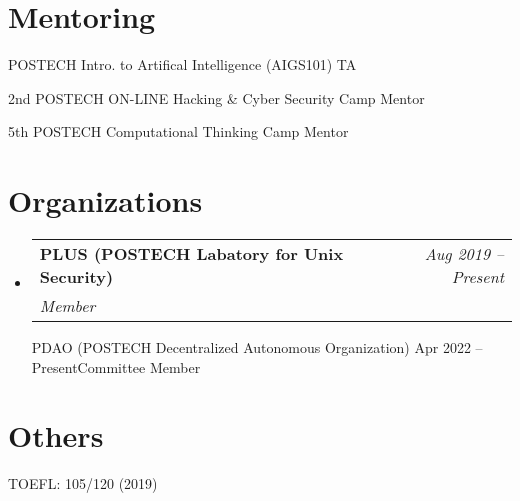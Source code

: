 \documentclass[letterpaper,11pt]{article}
\makeatletter
\newcommand{\resumeOrganizationHeading}[4]{
  \vspace{-2pt}\item
    \begin{tabular*}{0.97\textwidth}[t]{l@{\extracolsep{\fill}}r}
      \textbf{#1} & \textit{\small #2} \\
      \textit{\small#3}
    \end{tabular*}\vspace{-7pt}
}
\newcommand{\resumeSubHeadingListStart}{\begin{itemize}[leftmargin=0.15in, label={}]}
\newcommand{\resumeSubHeadingListEnd}{\end{itemize}}
\makeatother
\begin{document}

\section{Mentoring}
\vspace{3pt}
\resumeSubHeadingListStart
\small{
  \item {POSTECH Intro. to Artifical Intelligence (AIGS101) TA}
  \item {2nd POSTECH ON-LINE Hacking \& Cyber Security Camp Mentor}
  \item {5th POSTECH Computational Thinking Camp Mentor}
}
\resumeSubHeadingListEnd




\section{Organizations}
\vspace{3pt}
\resumeSubHeadingListStart

\resumeOrganizationHeading
{PLUS (POSTECH Labatory for Unix Security)}{Aug 2019 -- Present}{Member}

\resumeOrganizationHeading
{PDAO (POSTECH Decentralized Autonomous Organization)} {Apr 2022 -- Present}{Committee Member}

\resumeSubHeadingListEnd

\section{Others}
\vspace{3pt}
\resumeSubHeadingListStart
\small{
  \item {TOEFL: 105/120 (2019)}
}
\resumeSubHeadingListEnd










\end{document}

